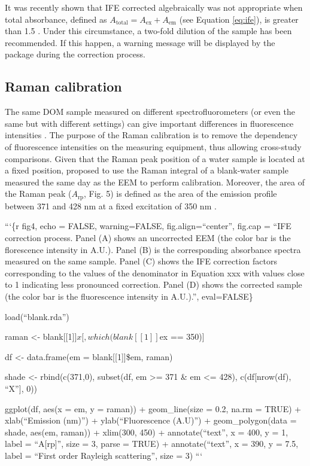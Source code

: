 \documentclass[]{book}
\theoremstyle{definition}
\theoremstyle{definition}
\theoremstyle{remark}
\begin{document}
It was recently shown that IFE corrected algebraically was not
appropriate when total absorbance, defined as
\(A_{\text{total}} = A_{\text{ex}} + A_{\text{em}}\) (see Equation
\eqref{eq:ife}), is greater than 1.5 \citep{Kothawala2013}. Under this
circumstance, a two-fold dilution of the sample has been recommended. If
this happen, a warning message will be displayed by the package during
the correction process.

\subsection{Raman calibration}\label{raman-calibration}

The same DOM sample measured on different spectrofluorometers (or even
the same but with different settings) can give important differences in
fluorescence intensities \citep{Lawaetz2009, Coble1993}. The purpose of
the Raman calibration is to remove the dependency of fluorescence
intensities on the measuring equipment, thus allowing cross-study
comparisons. Given that the Raman peak position of a water sample is
located at a fixed position, \citep{Lawaetz2009} proposed to use the
Raman integral of a blank-water sample measured the same day as the EEM
to perform calibration. Moreover, the area of the Raman peak
(\(A_{\text{rp}}\), Fig. 5) is defined as the area of the emission
profile between 371 and 428 nm at a fixed excitation of 350 nm
\citep{Lawaetz2009}.

```\{r fig4, echo = FALSE, warning=FALSE, fig.align=``center'', fig.cap
= ``IFE correction process. Panel (A) shows an uncorrected EEM (the
color bar is the florescence intensity in A.U.). Panel (B) is the
corresponding absorbance spectra measured on the same sample. Panel (C)
shows the IFE correction factors corresponding to the values of the
denominator in Equation xxx with values close to 1 indicating less
pronounced correction. Panel (D) shows the corrected sample (the color
bar is the fluorescence intensity in A.U.).'', eval=FALSE\}

load(``blank.rda'')

raman \textless{}- blank{[}{[}1{]}{]}\(x[, which(blank[[1]]\)ex ==
350){]}

df \textless{}- data.frame(em = blank{[}{[}1{]}{]}\$em, raman)

shade \textless{}- rbind(c(371,0), subset(df, em \textgreater{}= 371 \&
em \textless{}= 428), c(df{[}nrow(df), ``X''{]}, 0))

ggplot(df, aes(x = em, y = raman)) + geom\_line(size = 0.2, na.rm =
TRUE) + xlab(``Emission (nm)'') + ylab(``Fluorescence (A.U)'') +
geom\_polygon(data = shade, aes(em, raman)) + xlim(300, 450) +
annotate(``text'', x = 400, y = 1, label = ``A{[}rp{]}'', size = 3,
parse = TRUE) + annotate(``text'', x = 390, y = 7.5, label = ``First
order Rayleigh scattering'', size = 3) ```
\end{document}
